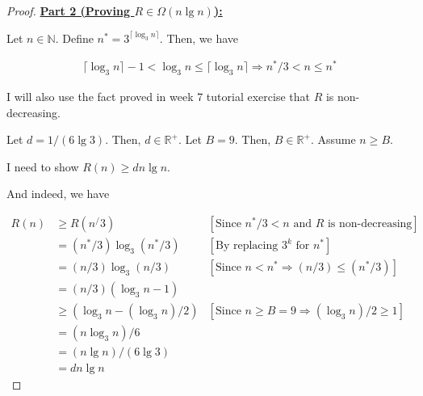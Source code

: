 \documentclass[12pt]{article}
\begin{document}
\begin{itemize}
\begin{proof}
    \bigskip

    \underline{\textbf{Part 2 (Proving $R \in \Omega(n \lg n)$):}}

    \bigskip

    Let $n \in \mathbb{N}$. Define $n^* = 3^{\lceil \log_3 n \rceil}$.
    Then, we have

    \begin{align}
        \lceil \log_3 n \rceil - 1 < \log_3 n \leq \lceil \log_3 n \rceil \Rightarrow n^*/3 < n \leq n^*
    \end{align}

    \bigskip

    I will also use the fact proved in week 7 tutorial exercise that
    $R$ is non-decreasing.

    \bigskip

    Let $d = 1/(6\lg 3)$. Then, $d \in \mathbb{R}^+$. Let $B = 9$. Then, $B \in \mathbb{R}^+$.
    Assume $n \geq B$.

    \bigskip

    I need to show $R(n) \geq dn\lg n$.

    \bigskip

    And indeed, we have

    \begin{align}
        R(n)&\geq R(n^/3) & [\text{Since $n^*/3 < n$ and $R$ is non-decreasing}]\\
        &= (n^*/3)\log_3 (n^*/3) & [\text{By replacing $3^k$ for $n^*$}]\\
        &= (n/3)\log_3 (n/3) & [\text{Since $n < n^* \Rightarrow (n/3) \leq (n^*/3)$}]\\
        &= (n/3)(\log_3 n - 1)\\
        &\geq (\log_3 n - (\log_3 n)/2)& [\text{Since $n \geq B = 9 \Rightarrow (\log_3 n)/2 \geq 1$}]\\
        &= (n\log_3 n)/6\\
        &= (n\lg n)/(6\lg 3)\\
        &= dn\lg n
    \end{align}

    \end{proof}







\end{itemize}
\end{document}
